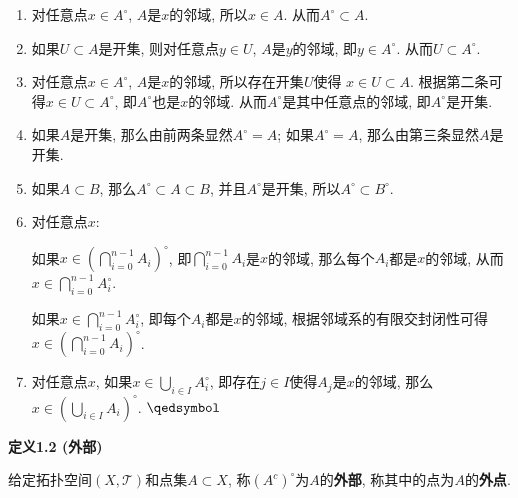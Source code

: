 \documentclass[UTF8]{ctexart}
\begin{document}
\begin{enumerate}
    \item 对任意点$x\in A^\circ$, $A$是$x$的邻域, 所以$x\in A$.
    从而$A^\circ\subset A$.
    \item 如果$U\subset A$是开集,
    则对任意点$y\in U$, $A$是$y$的邻域, 即$y\in A^\circ$. 从而$U\subset A^\circ$.
    \item 对任意点$x\in A^\circ$, $A$是$x$的邻域, 所以存在开集$U$使得
    $x\in U\subset A$. 根据第二条可得$x\in U\subset A^\circ$,
    即$A^\circ$也是$x$的邻域. 从而$A^\circ$是其中任意点的邻域, 即$A^\circ$是开集.
    \item 如果$A$是开集, 那么由前两条显然$A^\circ=A$;
    如果$A^\circ=A$, 那么由第三条显然$A$是开集.
    \item 如果$A\subset B$, 那么$A^\circ\subset A\subset B$,
    并且$A^\circ$是开集, 所以$A^\circ\subset B^\circ$.
    \item 对任意点$x$:
    
    \vspace{3pt}\hspace{2.17em}
    如果$\displaystyle x\in\left(\bigcap_{i=0}^{n-1}A_i\right)^\circ$,
    即$\displaystyle\bigcap_{i=0}^{n-1}A_i$是$x$的邻域,
    那么每个$A_i$都是$x$的邻域, 从而$\displaystyle x\in\bigcap_{i=0}^{n-1}A_i^\circ$.
    
    \vspace{3pt}\hspace{2.17em}
    如果$\displaystyle x\in\bigcap_{i=0}^{n-1}A_i^\circ$,
    即每个$A_i$都是$x$的邻域, 根据邻域系的有限交封闭性可得
    $\displaystyle x\in\left(\bigcap_{i=0}^{n-1}A_i\right)^\circ$.

    \vspace{5pt}
    \item 对任意点$x$, 如果$\displaystyle x\in\bigcup_{i\in I}A_i^\circ$,
    即存在$j\in I$使得$A_j$是$x$的邻域, 那么
    $\displaystyle x\in\left(\bigcup_{i\in I}A_i\right)^\circ$.
    \hfill $\qedsymbol$
\end{enumerate}

\vspace{10pt}

\hypertarget{sec:定义1.2}{}
\noindent\textbf{定义1.2 (外部)}

给定拓扑空间$(X,\mathcal{T})$和点集$A\subset X$,
称$(A^c)^\circ$为$A$的\textbf{外部}, 称其中的点为$A$的\textbf{外点}.





\newpage
\end{document}
